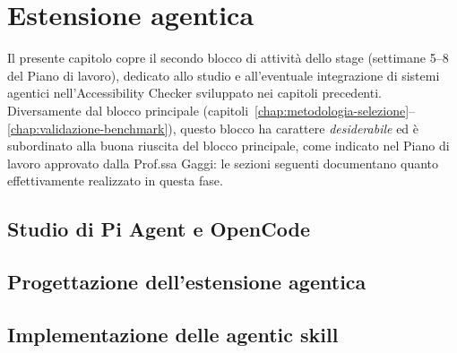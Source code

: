 \chapter{Estensione agentica}
\label{chap:estensione-agentica}

Il presente capitolo copre il secondo blocco di attività dello stage (settimane 5--8 del Piano di lavoro), dedicato allo studio e all'eventuale integrazione di sistemi agentici nell'Accessibility Checker sviluppato nei capitoli precedenti. Diversamente dal blocco principale (capitoli~\ref{chap:metodologia-selezione}--\ref{chap:validazione-benchmark}), questo blocco ha carattere \emph{desiderabile} ed è subordinato alla buona riuscita del blocco principale, come indicato nel Piano di lavoro approvato dalla Prof.ssa Gaggi: le sezioni seguenti documentano quanto effettivamente realizzato in questa fase.

\section{Studio di Pi Agent e OpenCode}
\label{sec:studio-pi-agent-opencode}




\section{Progettazione dell'estensione agentica}
\label{sec:progettazione-estensione-agentica}




\section{Implementazione delle agentic skill}
\label{sec:implementazione-agentic-skill}

